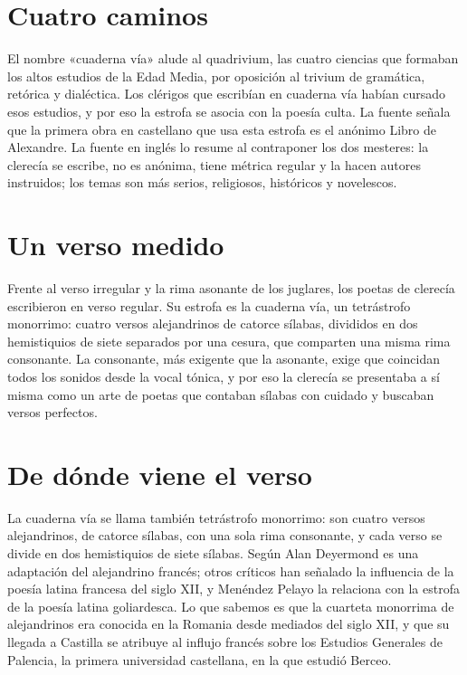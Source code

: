 \documentclass{book}
\begin{document}

\section{Cuatro caminos}

El nombre «cuaderna vía» alude al quadrivium, las cuatro ciencias que formaban los altos estudios de la Edad Media, por oposición al trivium de gramática, retórica y dialéctica. Los clérigos que escribían en cuaderna vía habían cursado esos estudios, y por eso la estrofa se asocia con la poesía culta. La fuente señala que la primera obra en castellano que usa esta estrofa es el anónimo Libro de Alexandre. La fuente en inglés lo resume al contraponer los dos mesteres: la clerecía se escribe, no es anónima, tiene métrica regular y la hacen autores instruidos; los temas son más serios, religiosos, históricos y novelescos.


\section{Un verso medido}

Frente al verso irregular y la rima asonante de los juglares, los poetas de clerecía escribieron en verso regular. Su estrofa es la cuaderna vía, un tetrástrofo monorrimo: cuatro versos alejandrinos de catorce sílabas, divididos en dos hemistiquios de siete separados por una cesura, que comparten una misma rima consonante. La consonante, más exigente que la asonante, exige que coincidan todos los sonidos desde la vocal tónica, y por eso la clerecía se presentaba a sí misma como un arte de poetas que contaban sílabas con cuidado y buscaban versos perfectos.


\section{De dónde viene el verso}

La cuaderna vía se llama también tetrástrofo monorrimo: son cuatro versos alejandrinos, de catorce sílabas, con una sola rima consonante, y cada verso se divide en dos hemistiquios de siete sílabas. Según Alan Deyermond es una adaptación del alejandrino francés; otros críticos han señalado la influencia de la poesía latina francesa del siglo XII, y Menéndez Pelayo la relaciona con la estrofa de la poesía latina goliardesca. Lo que sabemos es que la cuarteta monorrima de alejandrinos era conocida en la Romania desde mediados del siglo XII, y que su llegada a Castilla se atribuye al influjo francés sobre los Estudios Generales de Palencia, la primera universidad castellana, en la que estudió Berceo.
\end{document}
